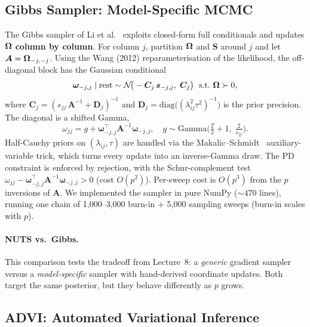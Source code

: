 \documentclass[10pt,conference,compsoc]{IEEEtran}
\newcommand{\Normal}{\mathcal{N}} \newcommand{\HalfCauchy}{\mathrm{C}^{+}} \newcommand{\InvGamma}{\mathrm{IG}}
\begin{document}
\subsection{Gibbs Sampler: Model-Specific MCMC}

The Gibbs sampler of Li et al.~\cite{li2019} exploits closed-form full conditionals and updates $\bm{\Omega}$ \textbf{column by column}. For column $j$, partition $\bm{\Omega}$ and $\bm{S}$ around $j$ and let $\bm{A} = \bm{\Omega}_{-j,-j}$. Using the Wang (2012) reparameterisation of the likelihood, the off-diagonal block has the Gaussian conditional
\begin{equation}
  \bm{\omega}_{-j,j} \mid \text{rest} \sim \Normal\!\big(-\bm{C}_j\,\bm{s}_{-j,j},\;\bm{C}_j\big)\;\text{ s.t.\ }\bOmega \succ 0,
  \label{eq:gibbs-offdiag}
\end{equation}
where $\bm{C}_j = (s_{jj}\,\bm{A}^{-1} + \bm{D}_j)^{-1}$ and $\bm{D}_j = \mathrm{diag}\big((\lambda_{ij}^2\tau^2)^{-1}\big)$ is the prior precision. The diagonal is a shifted Gamma,
\begin{equation}
  \omega_{jj} = g + \bm{\omega}_{-j,j}^\top\bm{A}^{-1}\bm{\omega}_{-j,j},\quad g \sim \mathrm{Gamma}\!\big(\tfrac{T}{2}{+}1,\; \tfrac{2}{s_{jj}}\big).
  \label{eq:gibbs-diag}
\end{equation}
Half-Cauchy priors on $(\lambda_{ij}, \tau)$ are handled via the Makalic--Schmidt~\cite{makalic2016} auxiliary-variable trick, which turns every update into an inverse-Gamma draw. The PD constraint is enforced by rejection, with the Schur-complement test $\omega_{jj} - \bm{\omega}_{-j,j}^\top\bm{A}^{-1}\bm{\omega}_{-j,j} > 0$ (cost $O(p^2)$). Per-sweep cost is $O(p^3)$ from the $p$ inversions of $\bm{A}$. We implemented the sampler in pure NumPy (${\sim}470$ lines), running one chain of 1{,}000--3{,}000 burn-in + 5{,}000 sampling sweeps (burn-in scales with $p$).

\paragraph{NUTS vs.\ Gibbs.} This comparison tests the tradeoff from Lecture~8: a \emph{generic} gradient sampler versus a \emph{model-specific} sampler with hand-derived coordinate updates. Both target the same posterior, but they behave differently as $p$ grows.

\subsection{ADVI: Automated Variational Inference}
\end{document}
